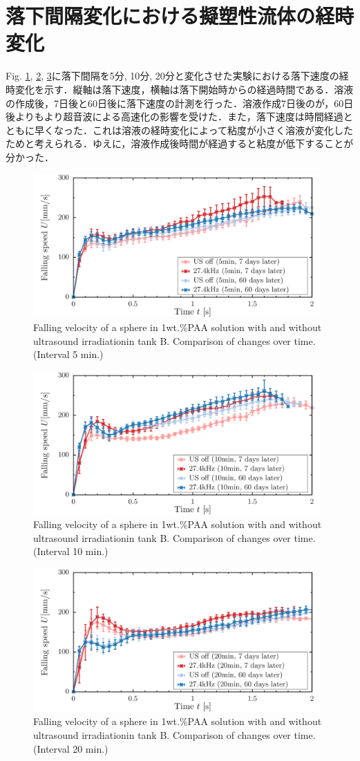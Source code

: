 \section{落下間隔変化における擬塑性流体の経時変化}

Fig. \ref{fig:falling-5-2}, \ref{fig:falling-10-2}, \ref{fig:falling-20-2}に落下間隔を5分, 10分, 20分と変化させた実験における落下速度の経時変化を示す．縦軸は落下速度，横軸は落下開始時からの経過時間である．溶液の作成後，7日後と60日後に落下速度の計測を行った．溶液作成7日後のが，60日後よりもより超音波による高速化の影響を受けた．また，落下速度は時間経過とともに早くなった．これは溶液の経時変化によって粘度が小さく溶液が変化したためと考えられる．ゆえに，溶液作成後時間が経過すると粘度が低下することが分かった．

\begin{figure}[H]
    \centering
    \includegraphics[width=11cm,clip]{X-Appendix/5.png}
    \caption{Falling velocity of a sphere in 1wt.\%PAA solution with and without ultrasound irradiationin tank B. Comparison of changes over time. (Interval 5 min.)}
    \label{fig:falling-5-2}
\end{figure}
\begin{figure}[H]
    \centering
    \includegraphics[width=11cm,clip]{X-Appendix/10.png}
    \caption{Falling velocity of a sphere in 1wt.\%PAA solution with and without ultrasound irradiationin tank B. Comparison of changes over time. (Interval 10 min.)}
    \label{fig:falling-10-2}
\end{figure}
\begin{figure}[H]
    \centering
    \includegraphics[width=11cm,clip]{X-Appendix/20.png}
    \caption{Falling velocity of a sphere in 1wt.\%PAA solution with and without ultrasound irradiationin tank B. Comparison of changes over time. (Interval 20 min.)}
    \label{fig:falling-20-2}
\end{figure}
